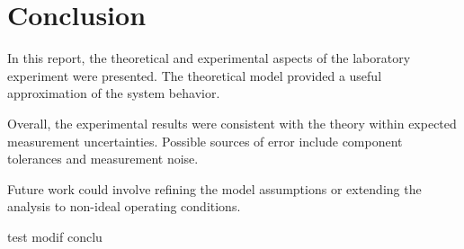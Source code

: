 \section{Conclusion}
\label{sec:conclusion}

In this report, the theoretical and experimental aspects of the laboratory experiment
were presented. The theoretical model provided a useful approximation of the system
behavior.

Overall, the experimental results were consistent with the theory within expected
measurement uncertainties. Possible sources of error include component tolerances
and measurement noise.

Future work could involve refining the model assumptions or extending the analysis
to non-ideal operating conditions.

test
modif conclu